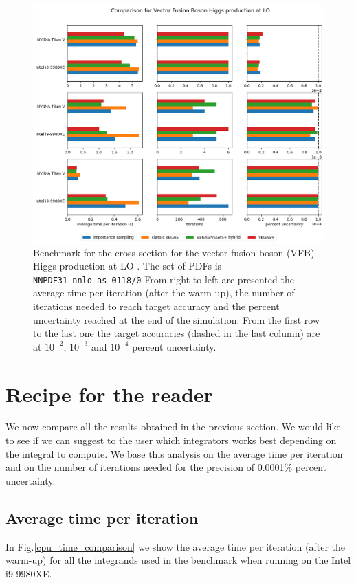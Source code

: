\documentclass[../main/main.tex]{subfiles}
\begin{document}
\begin{figure}[h]
	\centering
	\includegraphics[width=\textwidth]{../images/higgs_LO_final.png}
	\caption{Benchmark  for the cross section for the vector fusion boson (VFB) Higgs production at LO \cite{Brucherseifer_2014}. The set of PDFs is \texttt{NNPDF31\_nnlo\_as\_0118/0} From right to left are presented the average time per iteration (after the warm-up), the number of iterations needed to reach target accuracy and the percent uncertainty reached at the end of the simulation. From the first row to the last one the target accuracies (dashed in the last column) are at $10^{-2}$, $10^{-3}$ and $10^{-4}$ percent uncertainty.}
	\label{higgs_plot}
\end{figure}

\section{Recipe for the reader}
We now compare all the results obtained in the previous section. We would like to see if we can suggest to the user which integrators works best depending on the integral to compute. We base this analysis on the average time per iteration and on the number of iterations needed for the precision of 0.0001\% percent uncertainty.

\subsection{Average time per iteration}
In Fig.\ref{cpu_time_comparison} we show the average time per iteration (after the warm-up) for all the integrands used in the benchmark when running on the Intel i9-9980XE.
\end{document}
